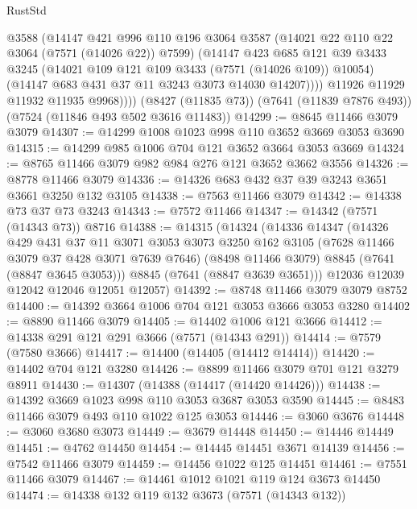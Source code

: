 \begin{lexlean}{RustStd}
\begin{coremodule}
              @3588
              (@14147
                @421
                @996
                @110
                @196
                @3064
                @3587
                (@14021 @22 @110 @22 @3064 (@7571 (@14026 @22)) @7599)
                (@14147
                  @423
                  @685
                  @121
                  @39
                  @3433
                  @3245
                  (@14021 @109 @121 @109 @3433 (@7571 (@14026 @109)) @10054)
                  (@14147 @683 @431 @37 @11 @3243 @3073 @14030 @14207))))
            @11926
            @11929
            @11932
            @11935
            @9968))))
    (@8427 (@11835 @73))
    (@7641 (@11839 @7876 @493))
    (@7524 (@11846 @493 @502 @3616 @11483))
@14299 := @8645 @11466 @3079 @3079
@14307 := @14299 @1008 @1023 @998 @110 @3652 @3669 @3053 @3690
@14315 := @14299 @985 @1006 @704 @121 @3652 @3664 @3053 @3669
@14324 := @8765 @11466 @3079 @982 @984 @276 @121 @3652 @3662 @3556
@14326 := @8778 @11466 @3079
@14336 := @14326 @683 @432 @37 @39 @3243 @3651 @3661 @3250 @132 @3105
@14338 := @7563 @11466 @3079
@14342 := @14338 @73 @37 @73 @3243
@14343 := @7572 @11466
@14347 := @14342 (@7571 (@14343 @73)) @8716
@14388 := @14315
    (@14324
      (@14336
        @14347
        (@14326
          @429
          @431
          @37
          @11
          @3071
          @3053
          @3073
          @3250
          @162
          @3105
          (@7628 @11466 @3079 @37 @428 @3071 @7639 @7646)
          (@8498 @11466 @3079)
          @8845
          (@7641 (@8847 @3645 @3053)))
        @8845
        (@7641 (@8847 @3639 @3651)))
      @12036
      @12039
      @12042
      @12046
      @12051
      @12057)
@14392 := @8748 @11466 @3079 @3079 @8752
@14400 := @14392 @3664 @1006 @704 @121 @3053 @3666 @3053 @3280
@14402 := @8890 @11466 @3079
@14405 := @14402 @1006 @121 @3666
@14412 := @14338 @291 @121 @291 @3666 (@7571 (@14343 @291))
@14414 := @7579 (@7580 @3666)
@14417 := @14400 (@14405 (@14412 @14414))
@14420 := @14402 @704 @121 @3280
@14426 := @8899 @11466 @3079 @701 @121 @3279 @8911
@14430 := @14307 (@14388 (@14417 (@14420 @14426)))
@14438 := @14392 @3669 @1023 @998 @110 @3053 @3687 @3053 @3590
@14445 := @8483 @11466 @3079 @493 @110 @1022 @125 @3053
@14446 := @3060 @3676
@14448 := @3060 @3680 @3073
@14449 := @3679 @14448
@14450 := @14446 @14449
@14451 := @4762 @14450
@14454 := @14445 @14451 @3671 @14139
@14456 := @7542 @11466 @3079
@14459 := @14456 @1022 @125 @14451
@14461 := @7551 @11466 @3079
@14467 := @14461 @1012 @1021 @119 @124 @3673 @14450
@14474 := @14338 @132 @119 @132 @3673 (@7571 (@14343 @132))

\end{coremodule}
\end{lexlean}
